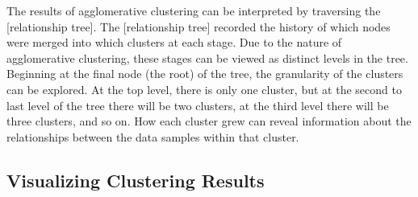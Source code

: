 The results of agglomerative clustering can be interpreted by traversing the [relationship tree]. The [relationship tree] recorded the history of which nodes were merged into which clusters at each stage. Due to the nature of agglomerative clustering, these stages can be viewed as distinct levels in the tree. Beginning at the final node (the root) of the tree, the granularity of the clusters can be explored. At the top level, there is only one cluster, but at the second to last level of the tree there will be two clusters, at the third level there will be three clusters, and so on. How each cluster grew can reveal information about the relationships between the data samples within that cluster.


%
%
%

\subsection{Visualizing Clustering Results} 

